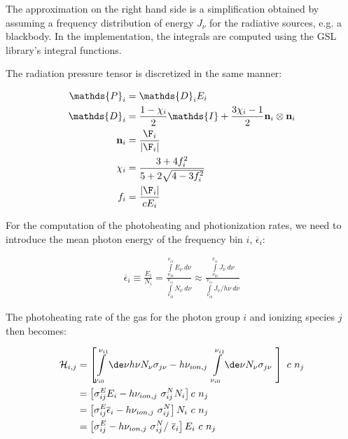 The approximation on the right hand side is a simplification obtained by assuming
a frequency distribution of energy $J_{\nu}$ for the radiative sources, e.g. a blackbody.
In the implementation, the integrals are computed using the GSL library's integral
functions.

The radiation pressure tensor is discretized in the same manner:


\begin{align}
	\mathds{P}_i &=
        \mathds{D}_i E_i \label{eq:pressure-tensor-group-start}\\
	\mathds{D}_i &=
        \frac{1- \chi_i}{2} \mathds{I} + \frac{3 \chi_i - 1}{2} \mathbf{n}_i \otimes \mathbf{n}_i \label{eq:eddington-group} \\
	\mathbf{n}_i &=
        \frac{\F_i}{|\F_i|} \\
	\chi_i &=
        \frac{3 + 4 f_i ^2}{5 + 2 \sqrt{4 - 3 f_i^2}} \\
	f_i &=
        \frac{|\F_i|}{c E_i} \label{eq:pressure-tensor-group-end}
\end{align}




For the computation of the  photoheating and photionization rates, we need to introduce the mean 
photon energy of the frequency bin $i$, $\overline{\epsilon}_i$:

\begin{align}
\overline{\epsilon}_i \equiv 
    \frac{E_i}{N_i} = 
    \frac{
        \int\limits_{\nu_{i0}}^{\nu_{i1}} E_\nu \ d\nu
        }{
        \int\limits_{\nu_{i0}}^{\nu_{i1}} N_\nu \ d\nu
        }  
    \approx
    \frac{
        \int\limits_{\nu_{i0}}^{\nu_{i1}} J_\nu \ d\nu
        }{
        \int\limits_{\nu_{i0}}^{\nu_{i1}} J_\nu / h\nu \ d\nu
        }
\end{align}

The photoheating rate of the gas for the photon group $i$ and ionizing species $j$ then becomes:

\begin{align}
\mathcal{H}_{i, j} &=
\left[
		\int\limits_{\nu_{i0}}^{\nu_{i1}}\de \nu h \nu N_\nu  \sigma_{j\nu} -
	h \nu_{ion,j}\
		\int\limits_{\nu_{i0}}^{\nu_{i1}}\de \nu N_\nu \sigma_{j\nu} \
\right] \ c \ n_j \\
%
&=
\left[
	\sigma_{ij}^E E_i - h \nu_{ion,j}\ \sigma_{ij}^N N_i
\right]  c \ n_j \\
&=
\left[
	\sigma_{ij}^E \overline{\epsilon}_i - h \nu_{ion,j}\ \sigma_{ij}^N
\right]  N_i\ c \ n_j \\
&=
\left[
	\sigma_{ij}^E  - h \nu_{ion,j}\ \sigma_{ij}^N /\ \overline{\epsilon}_i
\right]  E_i\ c \ n_j
\end{align}



